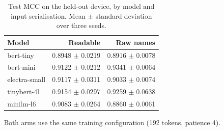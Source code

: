\begin{table}[htbp]
\centering
\caption{Test MCC on the held-out device, by model and input serialisation. Mean $\pm$ standard deviation over three seeds.}
\label{tab:per-serialisation}
\small
\begin{tabular}{lrr}
\toprule
Model & Readable & Raw names \\
\midrule
bert-tiny & 0.8948 $\pm$ 0.0219 & 0.8916 $\pm$ 0.0078 \\
bert-mini & 0.9122 $\pm$ 0.0212 & 0.9341 $\pm$ 0.0064 \\
electra-small & 0.9117 $\pm$ 0.0311 & 0.9033 $\pm$ 0.0074 \\
tinybert-4l & 0.9154 $\pm$ 0.0297 & 0.9259 $\pm$ 0.0638 \\
minilm-l6 & 0.9083 $\pm$ 0.0264 & 0.8860 $\pm$ 0.0061 \\
\bottomrule
\end{tabular}
\vspace{2pt}
\footnotesize Both arms use the same training configuration (192 tokens, patience 4).
\end{table}
